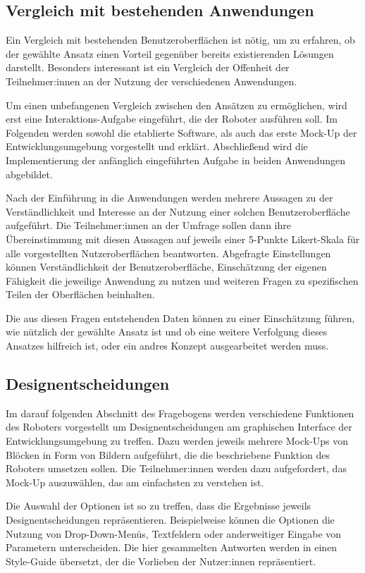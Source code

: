 \subsection{Vergleich mit bestehenden Anwendungen}
Ein Vergleich mit bestehenden Benutzeroberflächen ist nötig, um zu erfahren, ob der gewählte Ansatz einen Vorteil gegenüber bereits existierenden Lösungen darstellt. Besonders interessant ist ein Vergleich der Offenheit der Teilnehmer:innen an der Nutzung der verschiedenen Anwendungen.

Um einen unbefangenen Vergleich zwischen den Ansätzen zu ermöglichen, wird erst eine Interaktions-Aufgabe eingeführt, die der Roboter ausführen soll. Im Folgenden werden sowohl die etablierte Software, als auch das erste Mock-Up der Entwicklungsumgebung vorgestellt und erklärt. Abschließend wird die Implementierung der anfänglich eingeführten Aufgabe in beiden Anwendungen abgebildet.

Nach der Einführung in die Anwendungen werden mehrere Aussagen zu der Verständlichkeit und Interesse an der Nutzung einer solchen Benutzeroberfläche aufgeführt. Die Teilnehmer:innen an der Umfrage sollen dann ihre Übereinstimmung mit diesen Aussagen auf jeweils einer 5-Punkte Likert-Skala für alle vorgestellten Nutzeroberflächen beantworten. Abgefragte Einstellungen können Verständlichkeit der Benutzeroberfläche, Einschätzung der eigenen Fähigkeit die jeweilige Anwendung zu nutzen und weiteren Fragen zu spezifischen Teilen der Oberflächen beinhalten.

Die aus diesen Fragen entstehenden Daten können zu einer Einschätzung führen, wie nützlich der gewählte Ansatz ist und ob eine weitere Verfolgung dieses Ansatzes hilfreich ist, oder ein andres Konzept ausgearbeitet werden muss.

\subsection{Designentscheidungen} %
Im darauf folgenden Abschnitt des Fragebogens werden verschiedene Funktionen des Roboters vorgestellt um Designentscheidungen am graphischen Interface der Entwicklungsumgebung zu treffen. Dazu werden jeweils mehrere Mock-Ups von Blöcken in Form von Bildern aufgeführt, die die beschriebene Funktion des Roboters umsetzen sollen. Die Teilnehmer:innen werden dazu aufgefordert, das Mock-Up auszuwählen, das am einfachsten zu verstehen ist. 

Die Auswahl der Optionen ist so zu treffen, dass die Ergebnisse jeweils Designentscheidungen repräsentieren. Beispielweise können die Optionen die Nutzung von Drop-Down-Menüs, Textfeldern oder anderweitiger Eingabe von Parametern unterscheiden. Die hier gesammelten Antworten werden in einen Style-Guide übersetzt, der die Vorlieben der Nutzer:innen repräsentiert.

